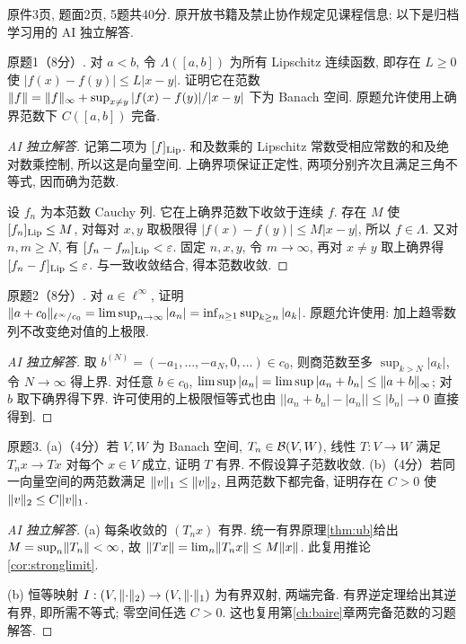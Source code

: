\label{ch:midterm}
原件3页, 题面2页, 5题共40分. 原开放书籍及禁止协作规定见课程信息; 以下是归档学习用的 AI 独立解答.
\begin{exercise}\label{midterm:1}
原题1（8分）. 对 $a<b$, 令 $\Lambda([a,b])$ 为所有 Lipschitz 连续函数, 即存在 $L\ge0$ 使 $|f(x)-f(y)|\le L|x-y|$. 证明它在范数 $\lVert f\rVert=\lVert f\rVert_\infty+\sup_{x\ne y}|f(x)-f(y)|/|x-y|$ 下为 Banach 空间. 原题允许使用上确界范数下 $C([a,b])$ 完备.
\end{exercise}
\begin{proof}[AI 独立解答]
记第二项为 $[f]_{\rm Lip}$. 和及数乘的 Lipschitz 常数受相应常数的和及绝对数乘控制, 所以这是向量空间. 上确界项保证正定性, 两项分别齐次且满足三角不等式, 因而确为范数.

设 $f_n$ 为本范数 Cauchy 列. 它在上确界范数下收敛于连续 $f$. 存在 $M$ 使 $[f_n]_{\rm Lip}\le M$, 对每对 $x,y$ 取极限得 $|f(x)-f(y)|\le M|x-y|$, 所以 $f\in\Lambda$. 又对 $n,m\ge N$, 有 $[f_n-f_m]_{\rm Lip}<\varepsilon$. 固定 $n,x,y$, 令 $m\to\infty$, 再对 $x\ne y$ 取上确界得 $[f_n-f]_{\rm Lip}\le\varepsilon$. 与一致收敛结合, 得本范数收敛.
\end{proof}
\begin{exercise}\label{midterm:2}
原题2（8分）. 对 $a\in\ell^\infty$, 证明 $\lVert a+c_0\rVert_{\ell^\infty/c_0}=\limsup_{n\to\infty}|a_n|=\inf_{n\ge1}\sup_{k\ge n}|a_k|$. 原题允许使用: 加上趋零数列不改变绝对值的上极限.
\end{exercise}
\begin{proof}[AI 独立解答]
取 $b^{(N)}=(-a_1,\ldots,-a_N,0,\ldots)\in c_0$, 则商范数至多 $\sup_{k>N}|a_k|$, 令 $N\to\infty$ 得上界. 对任意 $b\in c_0$, $\limsup|a_n|=\limsup|a_n+b_n|\le\lVert a+b\rVert_\infty$; 对 $b$ 取下确界得下界. 许可使用的上极限恒等式也由 $\big||a_n+b_n|-|a_n|\big|\le|b_n|\to0$ 直接得到.
\end{proof}
\begin{exercise}\label{midterm:3}
原题3. (a)（4分）若 $V,W$ 为 Banach 空间, $T_n\in\mathcal B(V,W)$, 线性 $T:V\to W$ 满足 $T_nx\to Tx$ 对每个 $x\in V$ 成立, 证明 $T$ 有界. 不假设算子范数收敛. (b)（4分）若同一向量空间的两范数满足 $\lVert v\rVert_1\le\lVert v\rVert_2$, 且两范数下都完备, 证明存在 $C>0$ 使 $\lVert v\rVert_2\le C\lVert v\rVert_1$.
\end{exercise}
\begin{proof}[AI 独立解答]
(a) 每条收敛的 $(T_nx)$ 有界. 统一有界原理\ref{thm:ub}给出 $M=\sup_n\lVert T_n\rVert<\infty$, 故 $\lVert Tx\rVert=\lim_n\lVert T_nx\rVert\le M\lVert x\rVert$. 此复用推论\ref{cor:stronglimit}.

(b) 恒等映射 $I:(V,\lVert \cdot\rVert_2)\to(V,\lVert \cdot\rVert_1)$ 为有界双射, 两端完备. 有界逆定理给出其逆有界, 即所需不等式; 零空间任选 $C>0$. 这也复用第\ref{ch:baire}章两完备范数的习题解答.
\end{proof}
